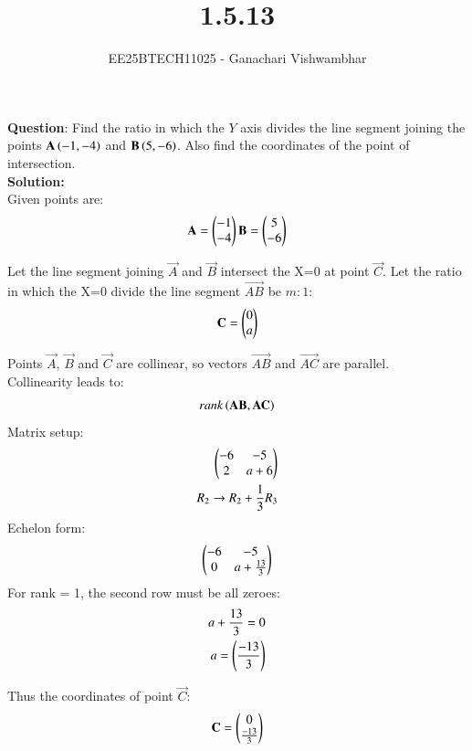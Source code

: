 \documentclass[journal]{IEEEtran}
\begin{document}
\title{1.5.13}
\author{EE25BTECH11025 - Ganachari Vishwambhar}
\maketitle

\textbf{Question}:\newline
Find the ratio in which the $Y$ axis divides the line segment joining the points $\mathbf{A}\left(-1,-4\right)$ and $\mathbf{B}\left(5,-6\right)$. Also find the coordinates of the point of intersection.\\
\textbf{Solution: }\\

Given points are:
\begin{align}
\mathbf{A}=\begin{pmatrix}-1\\-4\end{pmatrix}
\mathbf{B}=\begin{pmatrix}5\\-6\end{pmatrix}
\end{align}

Let the line segment joining $\vec{A}$ and $\vec{B}$ intersect the X=0 at point $\vec{C}$. Let the ratio in which the X=0 divide the line segment $\vec{AB}$ be $m:1$:
\begin{align}
\mathbf{C}=\begin{pmatrix}0\\a\end{pmatrix}
\end{align}

Points $\vec{A}$, $\vec{B}$ and $\vec{C}$ are collinear, so vectors $\vec{AB}$ and $\vec{AC}$ are parallel.\\
Collinearity leads to:
\begin{align}
    rank\left(\mathbf{AB},\mathbf{AC}\right)
\end{align}
Matrix setup:
\begin{align}
    \begin{pmatrix}-6&-5\\2&a+6\end{pmatrix}\\
    R_2 \rightarrow R_2 + \frac{1}{3}R_3\\
\end{align}
Echelon form:
\begin{align}
    \begin{pmatrix}-6&-5\\0&a+\frac{13}{3}\end{pmatrix}
\end{align}
For rank = 1, the second row must be all zeroes:
\begin{align}
    a+\frac{13}{3}=0\\
    a=\left(\frac{-13}{3}\right)
\end{align}

Thus the coordinates of point $\vec{C}$:
\begin{align}
    \mathbf{C}=\begin{pmatrix}0\\\frac{-13}{3}\end{pmatrix}
\end{align}
\end{document}

